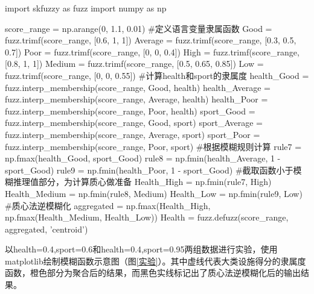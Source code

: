 \documentclass{article}
\begin{document}
\begin{python}
import skfuzzy as fuzz
import numpy as np

score_range = np.arange(0, 1.1, 0.01)
#定义语言变量隶属函数
Good = fuzz.trimf(score_range, [0.6, 1, 1])
Average = fuzz.trimf(score_range, [0.3, 0.5, 0.7])
Poor = fuzz.trimf(score_range, [0, 0, 0.4])
High = fuzz.trimf(score_range, [0.8, 1, 1])
Medium = fuzz.trimf(score_range, [0.5, 0.65, 0.85])
Low = fuzz.trimf(score_range, [0, 0, 0.55])
#计算health和sport的隶属度
health_Good = fuzz.interp_membership(score_range, Good, health)
health_Average = fuzz.interp_membership(score_range, Average, health)
health_Poor = fuzz.interp_membership(score_range, Poor, health)
sport_Good = fuzz.interp_membership(score_range, Good, sport)
sport_Average = fuzz.interp_membership(score_range, Average, sport)
sport_Poor = fuzz.interp_membership(score_range, Poor, sport)
#根据模糊规则计算
rule7 = np.fmax(health_Good, sport_Good)
rule8 = np.fmin(health_Average, 1 - sport_Good)
rule9 = np.fmin(health_Poor, 1 - sport_Good)
#截取函数小于模糊推理值部分，为计算质心做准备
Health_High = np.fmin(rule7, High)
Health_Medium = np.fmin(rule8, Medium)
Health_Low = np.fmin(rule9, Low)
#质心法逆模糊化
aggregated = np.fmax(Health_High, np.fmax(Health_Medium, Health_Low))
Health = fuzz.defuzz(score_range, aggregated, 'centroid')
\end{python}

以health=0.4,sport=0.6和health=0.4,sport=0.95两组数据进行实验，使用matplotlib绘制模糊函数示意图（图\ref{实验}）。其中虚线代表大类设施得分的隶属度函数，橙色部分为聚合后的结果，而黑色实线标记出了质心法逆模糊化后的输出结果。
\end{document}
